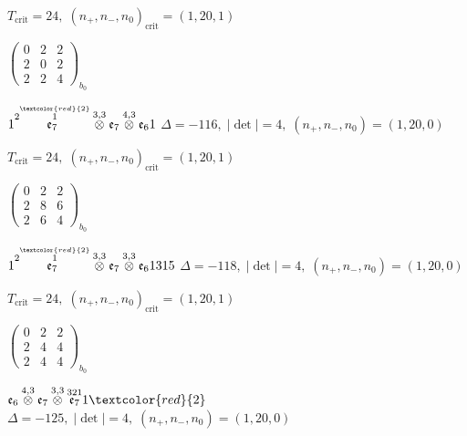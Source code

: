 \documentclass[10pt]{article}
\begin{document}
\hspace{1em}$T_{\text{crit}}=24,\; (n_+,n_-,n_0)_{\text{crit}}=(1,20,1)$

\hspace{2em}$\left(\begin{smallmatrix}0 & 2 & 2 \\ 2 & 0 & 2 \\ 2 & 2 & 4\end{smallmatrix}\right)_{\!b_0}$

\smallskip

$1\overset{2\overset{\textcolor{red}{2}}{1}}{\mathfrak{e}_7}\overset{3,3}{\otimes}\mathfrak{e}_7\overset{4,3}{\otimes}\mathfrak{e}_61$ \quad $\Delta=-116,\; |\det|=4,\; (n_+,n_-,n_0)=(1,20,0)$

\hspace{1em}$T_{\text{crit}}=24,\; (n_+,n_-,n_0)_{\text{crit}}=(1,20,1)$

\hspace{2em}$\left(\begin{smallmatrix}0 & 2 & 2 \\ 2 & 8 & 6 \\ 2 & 6 & 4\end{smallmatrix}\right)_{\!b_0}$

\smallskip

$1\overset{2\overset{\textcolor{red}{2}}{1}}{\mathfrak{e}_7}\overset{3,3}{\otimes}\mathfrak{e}_7\overset{3,3}{\otimes}\mathfrak{e}_61315$ \quad $\Delta=-118,\; |\det|=4,\; (n_+,n_-,n_0)=(1,20,0)$

\hspace{1em}$T_{\text{crit}}=24,\; (n_+,n_-,n_0)_{\text{crit}}=(1,20,1)$

\hspace{2em}$\left(\begin{smallmatrix}0 & 2 & 2 \\ 2 & 4 & 4 \\ 2 & 4 & 4\end{smallmatrix}\right)_{\!b_0}$

\smallskip

$\mathfrak{e}_6\overset{4,3}{\otimes}\mathfrak{e}_7\overset{3,3}{\otimes}\overset{321}{\mathfrak{e}_7}1\textcolor{red}{2}$ \quad $\Delta=-125,\; |\det|=4,\; (n_+,n_-,n_0)=(1,20,0)$
\end{document}
